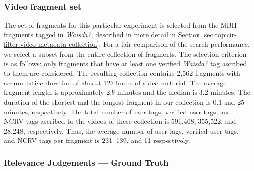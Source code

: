 \subsubsection{Video fragment set}
The set of fragments for this particular experiment is selected from the MBH fragments tagged in \textit{Waisda?}, described in more detail in Section \ref{sec:topicir-filter:video-metadata-collection}. For a fair comparison of the search performance, we select a subset from the entire collection of fragments. The selection criterion is as follows: only fragments that have at least one verified \textit{Waisda?} tag ascribed to them are considered. The resulting collection contains 2,562 fragments with accumulative duration of almost 123 hours of video material.
The average fragment length is approximately 2.9 minutes and the median is 3.2 minutes. The duration of the shortest and the longest fragment in our collection is 0.1 and 25 minutes, respectively. The total number of user tags, verified user tags, and NCRV tags ascribed to the videos of these collection is 591,468, 355,522, and 28,248, respectively. Thus, the average number of user tags, verified user tags, and NCRV tags per fragment is 231, 139, and 11 respectively.


\subsubsection{Relevance Judgements --- Ground Truth}\label{filter:ground-truth}

